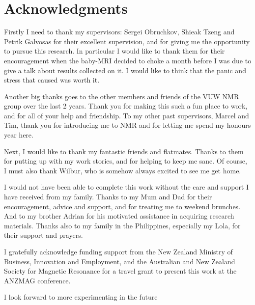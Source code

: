 \chapter*{Acknowledgments}\label{ch:ack}
Firstly I need to thank my supervisors: Sergei Obruchkov, Shieak Tzeng and Petrik Galvosas for their excellent supervision, and for giving me the opportunity to pursue this research.
In particular I would like to thank them for their encouragement when the baby-MRI decided to choke a month before I was due to give a talk about results collected on it.
I would like to think that the panic and stress that caused was worth it.

Another big thanks goes to the other members and friends of the VUW NMR group over the last 2 years.
Thank you for making this such a fun place to work, and for all of your help and friendship.
To my other past supervisors, Marcel and Tim, thank you for introducing me to NMR and for letting me spend my honours year here.

Next, I would like to thank my fantastic friends and flatmates.
Thanks to them for putting up with my work stories, and for helping to keep me sane.
Of course, I must also thank Wilbur, who is somehow always excited to see me get home.

I would not have been able to complete this work without the care and support I have received from my family.
Thanks to my Mum and Dad for their encouragement, advice and support, and for treating me to weekend brunches.
And to my brother Adrian for his motivated assistance in acquiring research materials.
Thanks also to my family in the Philippines, especially my Lola, for their support and prayers.

I gratefully acknowledge funding support from the New Zealand Ministry of Business, Innovation and Employment, and the Australian and New Zealand Society for Magnetic Resonance for a travel grant to present this work at the ANZMAG conference.

I look forward to more experimenting in the future
